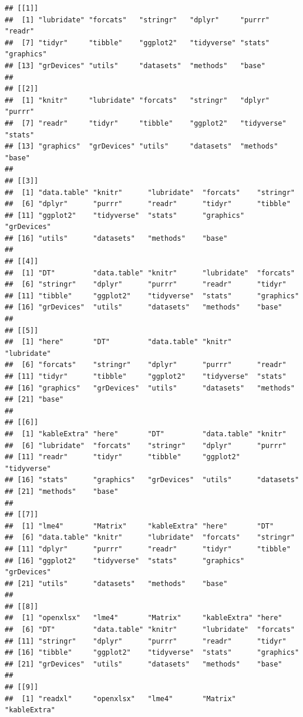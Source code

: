 \documentclass[
]{article}
\begin{document}
\begin{verbatim}
## [[1]]
##  [1] "lubridate" "forcats"   "stringr"   "dplyr"     "purrr"     "readr"    
##  [7] "tidyr"     "tibble"    "ggplot2"   "tidyverse" "stats"     "graphics" 
## [13] "grDevices" "utils"     "datasets"  "methods"   "base"     
## 
## [[2]]
##  [1] "knitr"     "lubridate" "forcats"   "stringr"   "dplyr"     "purrr"    
##  [7] "readr"     "tidyr"     "tibble"    "ggplot2"   "tidyverse" "stats"    
## [13] "graphics"  "grDevices" "utils"     "datasets"  "methods"   "base"     
## 
## [[3]]
##  [1] "data.table" "knitr"      "lubridate"  "forcats"    "stringr"   
##  [6] "dplyr"      "purrr"      "readr"      "tidyr"      "tibble"    
## [11] "ggplot2"    "tidyverse"  "stats"      "graphics"   "grDevices" 
## [16] "utils"      "datasets"   "methods"    "base"      
## 
## [[4]]
##  [1] "DT"         "data.table" "knitr"      "lubridate"  "forcats"   
##  [6] "stringr"    "dplyr"      "purrr"      "readr"      "tidyr"     
## [11] "tibble"     "ggplot2"    "tidyverse"  "stats"      "graphics"  
## [16] "grDevices"  "utils"      "datasets"   "methods"    "base"      
## 
## [[5]]
##  [1] "here"       "DT"         "data.table" "knitr"      "lubridate" 
##  [6] "forcats"    "stringr"    "dplyr"      "purrr"      "readr"     
## [11] "tidyr"      "tibble"     "ggplot2"    "tidyverse"  "stats"     
## [16] "graphics"   "grDevices"  "utils"      "datasets"   "methods"   
## [21] "base"      
## 
## [[6]]
##  [1] "kableExtra" "here"       "DT"         "data.table" "knitr"     
##  [6] "lubridate"  "forcats"    "stringr"    "dplyr"      "purrr"     
## [11] "readr"      "tidyr"      "tibble"     "ggplot2"    "tidyverse" 
## [16] "stats"      "graphics"   "grDevices"  "utils"      "datasets"  
## [21] "methods"    "base"      
## 
## [[7]]
##  [1] "lme4"       "Matrix"     "kableExtra" "here"       "DT"        
##  [6] "data.table" "knitr"      "lubridate"  "forcats"    "stringr"   
## [11] "dplyr"      "purrr"      "readr"      "tidyr"      "tibble"    
## [16] "ggplot2"    "tidyverse"  "stats"      "graphics"   "grDevices" 
## [21] "utils"      "datasets"   "methods"    "base"      
## 
## [[8]]
##  [1] "openxlsx"   "lme4"       "Matrix"     "kableExtra" "here"      
##  [6] "DT"         "data.table" "knitr"      "lubridate"  "forcats"   
## [11] "stringr"    "dplyr"      "purrr"      "readr"      "tidyr"     
## [16] "tibble"     "ggplot2"    "tidyverse"  "stats"      "graphics"  
## [21] "grDevices"  "utils"      "datasets"   "methods"    "base"      
## 
## [[9]]
##  [1] "readxl"     "openxlsx"   "lme4"       "Matrix"     "kableExtra"

\end{verbatim}
\end{document}
